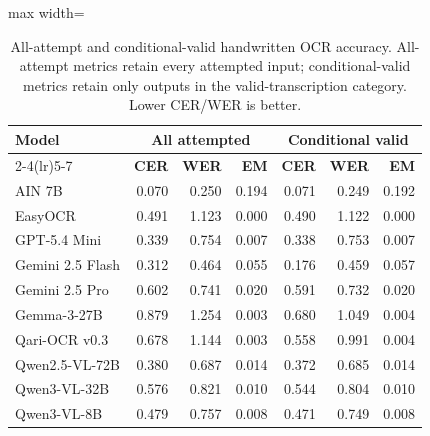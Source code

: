\begin{table}[t]
\centering
\scriptsize
\caption{All-attempt and conditional-valid handwritten OCR accuracy. All-attempt metrics retain every attempted input; conditional-valid metrics retain only outputs in the valid-transcription category. Lower CER/WER is better.}
\label{tab:app_handwritten_conditional_accuracy}
\begin{adjustbox}{max width=\textwidth}
\begin{tabular}{lrrrrrr}
\toprule
\textbf{Model} & \multicolumn{3}{c}{\textbf{All attempted}} & \multicolumn{3}{c}{\textbf{Conditional valid}}\\
\cmidrule(lr){2-4}\cmidrule(lr){5-7}
& \textbf{CER} & \textbf{WER} & \textbf{EM} & \textbf{CER} & \textbf{WER} & \textbf{EM}\\
\midrule
AIN 7B & 0.070 & 0.250 & 0.194 & 0.071 & 0.249 & 0.192\\
EasyOCR & 0.491 & 1.123 & 0.000 & 0.490 & 1.122 & 0.000\\
GPT-5.4 Mini & 0.339 & 0.754 & 0.007 & 0.338 & 0.753 & 0.007\\
Gemini 2.5 Flash & 0.312 & 0.464 & 0.055 & 0.176 & 0.459 & 0.057\\
Gemini 2.5 Pro & 0.602 & 0.741 & 0.020 & 0.591 & 0.732 & 0.020\\
Gemma-3-27B & 0.879 & 1.254 & 0.003 & 0.680 & 1.049 & 0.004\\
Qari-OCR v0.3 & 0.678 & 1.144 & 0.003 & 0.558 & 0.991 & 0.004\\
Qwen2.5-VL-72B & 0.380 & 0.687 & 0.014 & 0.372 & 0.685 & 0.014\\
Qwen3-VL-32B & 0.576 & 0.821 & 0.010 & 0.544 & 0.804 & 0.010\\
Qwen3-VL-8B & 0.479 & 0.757 & 0.008 & 0.471 & 0.749 & 0.008\\
\bottomrule
\end{tabular}
\end{adjustbox}
\end{table}
